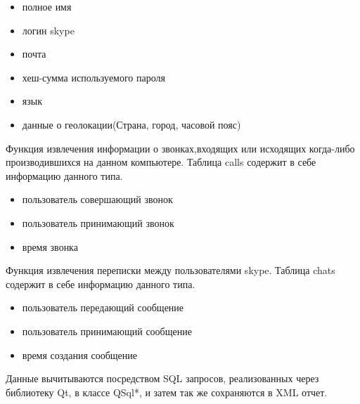 \begin{itemize}
\item полное имя
\item логин skype
\item почта
\item хеш-сумма используемого пароля
\item язык
\item данные о геолокации(Страна, город, часовой пояс)
\end{itemize}

Функция извлечения информации о звонках,входящих или исходящих когда-либо производившихся на данном компьютере. Таблица calls содержит в себе информацию данного типа.

\begin{itemize}
\item пользователь совершающий звонок
\item пользователь принимающий звонок
\item время звонка
\end{itemize}

Функция извлечения переписки между пользователями skype. Таблица chats содержит в себе информацию данного типа.

\begin{itemize}
\item пользователь передающий сообщение 
\item пользователь принимающий сообщение 
\item время создания сообщение 
\end{itemize}

Данные вычитываются посредством SQL запросов, реализованных через библиотеку Qt, в классе QSql*, и затем так же сохраняются в XML отчет.

